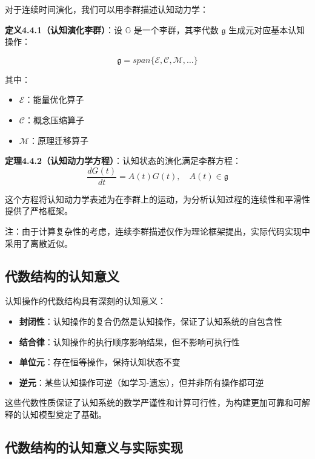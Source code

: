 \documentclass[12pt,a4paper]{article}
\newcommand{\cognitivegroup}{\mathbb{G}}
\newcommand{\energyoperator}{\mathcal{E}}
\newcommand{\compressionoperator}{\mathcal{C}}
\newcommand{\migrationoperator}{\mathcal{M}}
\begin{document}
对于连续时间演化，我们可以用李群描述认知动力学：

\textbf{定义4.4.1（认知演化李群）}：设 $\cognitivegroup$ 是一个李群，其李代数 $\mathfrak{g}$ 生成元对应基本认知操作：

\begin{equation}
\mathfrak{g} = span\{\energyoperator, \compressionoperator, \migrationoperator, \ldots\}
\end{equation}

其中：
\begin{itemize}
\item $\energyoperator$：能量优化算子
\item $\compressionoperator$：概念压缩算子  
\item $\migrationoperator$：原理迁移算子
\end{itemize}

\textbf{定理4.4.2（认知动力学方程）}：认知状态的演化满足李群方程：
\begin{equation}
\frac{dG(t)}{dt} = A(t)G(t), \quad A(t) \in \mathfrak{g}
\end{equation}

这个方程将认知动力学表述为在李群上的运动，为分析认知过程的连续性和平滑性提供了严格框架。

注：由于计算复杂性的考虑，连续李群描述仅作为理论框架提出，实际代码实现中采用了离散近似。

\subsection{代数结构的认知意义}

认知操作的代数结构具有深刻的认知意义：

\begin{itemize}
\item \textbf{封闭性}：认知操作的复合仍然是认知操作，保证了认知系统的自包含性
\item \textbf{结合律}：认知操作的执行顺序影响结果，但不影响可执行性
\item \textbf{单位元}：存在恒等操作，保持认知状态不变
\item \textbf{逆元}：某些认知操作可逆（如学习-遗忘），但并非所有操作都可逆
\end{itemize}

这些代数性质保证了认知系统的数学严谨性和计算可行性，为构建更加可靠和可解释的认知模型奠定了基础。

\subsection{代数结构的认知意义与实际实现}
\label{subsec:algebraic_implementation}
\end{document}
